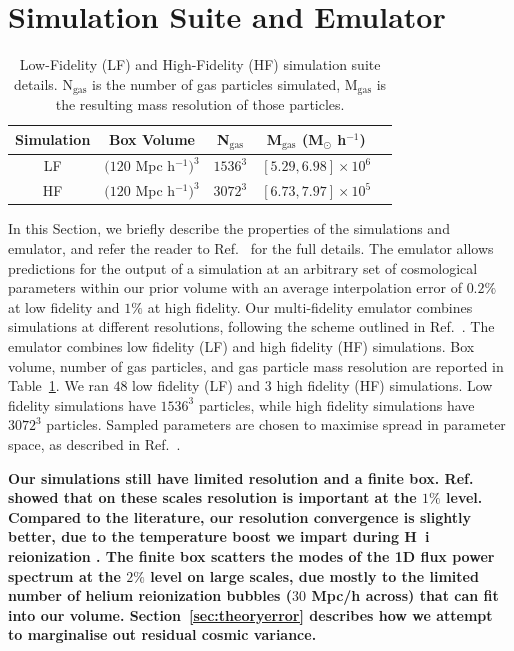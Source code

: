 \section{Simulation Suite and Emulator}
\label{sec:emulator}
\label{sec:simulations}

\begin{table}
	\centering
     \begin{tabular}{|c|c|c|c|c|}
		\hline
		Simulation & Box Volume & N$_{\text{gas}}$ & M$_{\text{gas}}$ (M$_{\odot}$ h$^{-1}$)\\
		\hline
		LF & $(120$ Mpc h$^{-1})^3$ & $1536^3$ & $[5.29, 6.98]\times10^6$\\
		HF & $(120$ Mpc h$^{-1})^3$ & $3072^3$ & $[6.73, 7.97]\times10^5$\\
		\hline
	\end{tabular}
    \caption{\label{table:simulations}
    Low-Fidelity (LF) and High-Fidelity (HF) simulation suite details.
    N$_{\text{gas}}$ is the number of gas particles simulated, M$_{\text{gas}}$ is the resulting mass resolution of those particles.}
\end{table}

In this Section, we briefly describe the properties of the simulations and emulator, and refer the reader to Ref.~\cite{2023simsuite} for the full details.
The emulator allows predictions for the output of a simulation at an arbitrary set of cosmological parameters within our prior volume with an average interpolation error of $0.2\%$ at low fidelity and $1\%$ at high fidelity.
Our multi-fidelity emulator combines simulations at different resolutions, following the scheme outlined in Ref.~\cite{2022MNRAS.517.3200F}.
The emulator combines low fidelity (LF) and high fidelity (HF) simulations.
Box volume, number of gas particles, and gas particle mass resolution are reported in Table~\ref{table:simulations}.
We ran $48$ low fidelity (LF) and $3$ high fidelity (HF) simulations.
Low fidelity simulations have $1536^3$ particles, while high fidelity simulations have $3072^3$ particles.
Sampled parameters are chosen to maximise spread in parameter space, as described in Ref.~\cite{2023simsuite}. 

\textbf{Our simulations still have limited resolution and a finite box. Ref.~\cite{2023simsuite} showed that on these scales resolution is important at the $1\%$ level. Compared to the literature, our resolution convergence is slightly better, due to the temperature boost we impart during H~{\sc i} reionization \cite{2019ApJ...874..154D}. The finite box scatters the modes of the 1D flux power spectrum at the $2\%$ level on large scales, due mostly to the limited number of helium reionization bubbles ($30$ Mpc/h across) that can fit into our volume. Section~\ref{sec:theoryerror} describes how we attempt to marginalise out residual cosmic variance.}

